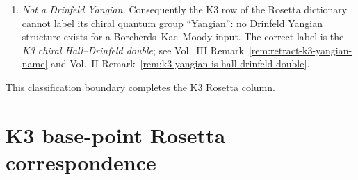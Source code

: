 \begin{remark}
\begin{enumerate}[label=\textup{(D\arabic*)}]
 the \emph{Gritsenko additive lift}
 $\Delta_5 = \mathrm{Grit}(\eta^9\vartheta_1)$ from the weight-$9/2$
 index-$1/2$ Jacobi form $\eta^9\vartheta_1$
 \textup{(}Gritsenko $1999$\textup{)}, and the \emph{Borcherds
	 multiplicative lift}
	 $\Delta_5 = \mathrm{Borch}(\phi_{0,1}^{\mathrm{EZ}})$ from the
	 weight-$0$ index-$1$ Jacobi form with
	 $\phi_{0,1}^{K3}=\phi_{0,1}^{\mathrm{EZ}}$
 \textup{(}Borcherds $1998$\textup{)}. Both produce the same weight-$5$
 Siegel form on the Maass $\Z/2$-spin cover of
 $\mathrm{Sp}_4(\mathbb{Z})$; their equivalence is a Shimura--Waldspurger
 phenomenon. The M-theory side
 (Remark~\ref{rem:rosetta-Delta5-11D-SUGRA}) sees the additive
 lift: the weight-$5$ SUGRA one-loop determinant is the Gritsenko
 image of the $\mathcal{N}=4$ chiral-half index. The class-$\cS$ side
	 (Remark~\ref{rem:rosetta-classS-sigma-0-24}) sees the
	 multiplicative lift: the protected Schur index reduces under
	 $M_{24}$-averaging to $\phi_{0,1}^{K3}=\phi_{0,1}^{\mathrm{EZ}}$, whose Borcherds
 singular-theta lift is $\Delta_5$. The Rosetta dictionary's two M-theory and
 gauge-theory entries are therefore related by Gritsenko--Borcherds
 duality \textup{(}Gritsenko--Nikulin $1998$, Theorem $2.1$\textup{)}.
 Ikeda $2001$ produces $\Delta_{10}$ from a weight-$16$ elliptic
 source; it does not produce $\Delta_5$.
\item \emph{Not a Drinfeld Yangian.} Consequently the K3 row of the
 Rosetta dictionary cannot label its chiral quantum group ``Yangian'':
 no Drinfeld Yangian structure exists for a Borcherds--Kac--Moody
 input. The correct label is the \emph{K3 chiral Hall--Drinfeld
 double}; see Vol.~III
 Remark~\ref{rem:retract-k3-yangian-name} and Vol.~II
 Remark~\ref{rem:k3-yangian-is-hall-drinfeld-double}.
\end{enumerate}
This classification boundary completes the K3 Rosetta column.
\end{remark}

\section{K3 base-point Rosetta correspondence}
\label{sec:rs-supplement}

